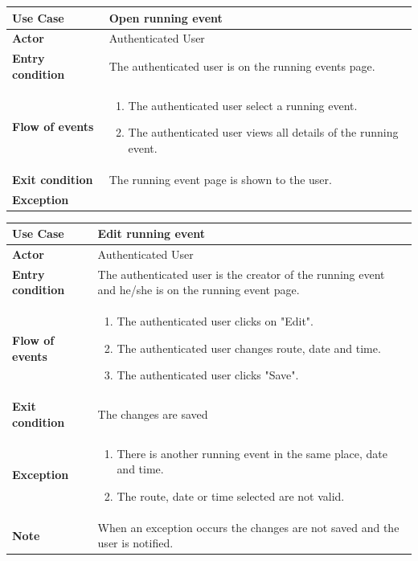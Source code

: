 \documentclass[../main.tex]{subfiles}
\begin{document}
	\vspace*{3cm}
	\begin{center}
		\begin{tabular}{p{3cm}p{8.28cm}}
			\hline
			\textbf{Use Case} & Open running event\\
			\hline
			\textbf{Actor} & Authenticated User\\
			\hline
			\textbf{Entry condition} & The authenticated user is on the running events page.\\
			\hline
			\textbf{Flow of events} & \begin{enumerate}
				\linespread{0}\item The authenticated user select a running event.
				\linespread{0}\item The authenticated user views all details of the running event.
			\end{enumerate}\\
			\hline
			\textbf{Exit condition} & The running event page is shown to the user.\\
			\hline
			\textbf{Exception}\\
			\hline
		\end{tabular}
	\end{center}
	\vspace*{3cm}
	\begin{center}
		\begin{tabular}{p{3cm}p{8.28cm}}
			\hline
			\textbf{Use Case} & Edit running event\\
			\hline
			\textbf{Actor} & Authenticated User\\
			\hline
			\textbf{Entry condition} & The authenticated user is the creator of the running event and he/she is on the running event page.\\
			\hline
			\textbf{Flow of events} & \begin{enumerate}
				\linespread{0}\item The authenticated user clicks on "Edit".
				\linespread{0}\item The authenticated user changes route, date and time.
				\linespread{0}\item The authenticated user clicks "Save".
			\end{enumerate}\\
			\hline
			\textbf{Exit condition} & The changes are saved\\
			\hline
			\textbf{Exception}& \begin{enumerate}
				\linespread{0}\item There is another running event in the same place, date and time.
				\linespread{0}\item The route, date or time selected are not valid.
			\end{enumerate}\\
			\hline
			\textbf{Note} & When an exception occurs the changes are not saved and the user is notified.\\
			\hline
		\end{tabular}
	\end{center}
\end{document}
